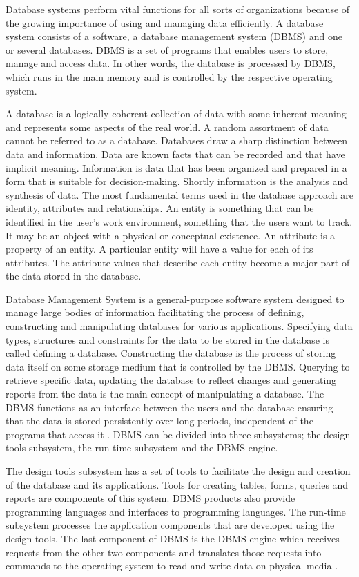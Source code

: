 Database systems perform vital functions for all sorts of organizations because
of the growing importance of using and managing data efficiently. A database
system consists of a software, a database management system (DBMS) and one or
several databases. DBMS is a set of programs that enables users to store, manage
and access data. In other words, the database is processed by DBMS, which runs
in the main memory and is controlled by the respective operating system.

A database is a logically coherent collection of data with some inherent meaning
and represents some aspects of the real world. A random assortment of data
cannot be referred to as a database. Databases draw a sharp distinction between
data and information. Data are known facts that can be recorded and that have
implicit meaning. Information is data that has been organized and prepared in a
form that is suitable for decision-making. Shortly information is the analysis
and synthesis of data. The most fundamental terms used in the database approach
are identity, attributes and relationships. An entity is something that can be
identified in the user's work environment, something that the users want to
track. It may be an object with a physical or conceptual existence. An attribute
is a property of an entity. A particular entity will have a value for each of
its attributes. The attribute values that describe each entity become a major
part of the data stored in the database.

Database Management System is a general-purpose software system designed to
manage large bodies of information facilitating the process of defining,
constructing and manipulating databases for various applications. Specifying
data types, structures and constraints for the data to be stored in the database
is called defining a database. Constructing the database is the process of
storing data itself on some storage medium that is controlled by the DBMS.
Querying to retrieve specific data, updating the database to reflect changes and
generating reports from the data is the main concept of manipulating a database.
The DBMS functions as an interface between the users and the database ensuring
that the data is stored persistently over long periods, independent of the
programs that access it \cite{latisen1998}. DBMS can be divided into three
subsystems; the design tools subsystem, the run-time subsystem and the DBMS
engine.

The design tools subsystem has a set of tools to facilitate the design and
creation of the database and its applications. Tools for creating tables, forms,
queries and reports are components of this system. DBMS products also provide
programming languages and interfaces to programming languages. The run-time
subsystem processes the application components that are developed using the
design tools. The last component of DBMS is the DBMS engine which receives
requests from the other two components and translates those requests into
commands to the operating system to read and write data on physical media
\cite{elmasri1998}.

